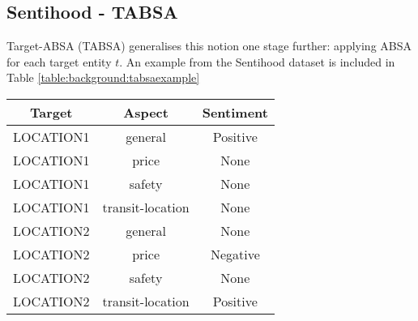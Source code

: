 {{\subsection{Sentihood - TABSA} \label{section:background:sentihood}
Target-ABSA (TABSA) generalises this notion one stage further: applying ABSA for each target entity $t$. An example from the Sentihood dataset is included in Table \ref{table:background:tabsaexample}

\begin{center}
\begin{tabular}{|c|c|c|}
	\hline
	Target & Aspect & Sentiment \\
	\hline
	{\color{black} LOCATION1} & {\color{purple} general} & {\color{green} Positive} \\
	{\color{black} LOCATION1} & {\color{cyan} price} & {\color{gray} None} \\
	{\color{black} LOCATION1} & {\color{orange} safety} & {\color{gray} None} \\
	{\color{black} LOCATION1} & {\color{pink} transit-location} & {\color{gray} None} \\
	\hline \hline
	{\color{black} LOCATION2} & {\color{purple} general} & {\color{gray} None} \\
	{\color{black} LOCATION2} & {\color{cyan} price} & {\color{red} Negative} \\
	{\color{black} LOCATION2} & {\color{orange} safety} & {\color{gray} None} \\
	{\color{black} LOCATION2} & {\color{pink} transit-location} & {\color{green} Positive} \\
	\hline
\end{tabular}
 \label{table:background:tabsaexample}
\end{center}

}}

